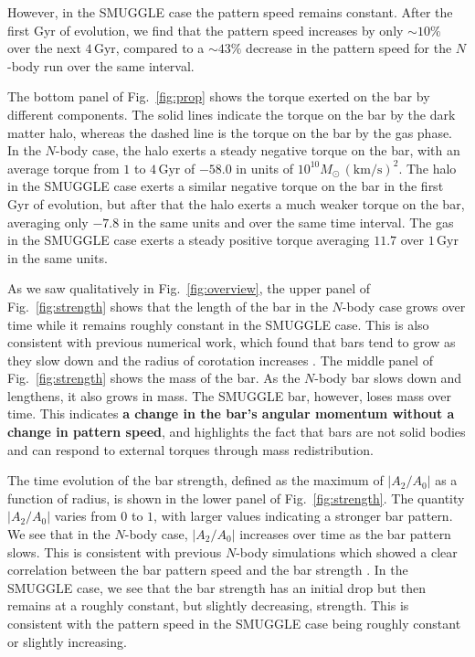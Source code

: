 \documentclass[twocolumn,linenumbers,trackchanges]{aastex631}
\newcommand{\Nbody}{$N$-body}
\newcommand{\SMUGGLE}{SMUGGLE}
\begin{document}
However, in the \SMUGGLE{} case the pattern speed remains constant. After the first
Gyr of evolution, we find that the pattern speed increases by only $\sim10\%$
over the next $4\,\textrm{Gyr}$, compared to a $\sim43\%$ decrease in the
pattern speed for the \Nbody{} run over the same interval.

The bottom panel of Fig.~\ref{fig:prop} shows the torque exerted on the bar by
different components. The solid lines indicate the torque on the bar by the dark
matter halo, whereas the dashed line is the torque on the bar by the gas phase.
In the \Nbody{} case, the halo exerts a steady negative torque on the bar, with
an average torque from $1$ to $4\,\textrm{Gyr}$ of $-58.0$ in units of
$10^{10}M_{\odot}\,(\textrm{km}/\textrm{s})^2$. The halo in the \SMUGGLE{} case
exerts a similar negative torque on the bar in the first Gyr of evolution, but
after that the halo exerts a much weaker torque on the bar, averaging only
$-7.8$ in the same units and over the same time interval. The gas in the \SMUGGLE{}
case exerts a steady positive torque averaging $11.7$ over $1\,\textrm{Gyr}$ in
the same units.

As we saw qualitatively in Fig.~\ref{fig:overview}, the upper panel of
Fig.~\ref{fig:strength} shows that the length of the bar in the \Nbody{} case
grows over time while it remains roughly constant in the \SMUGGLE{} case. This
is also consistent with previous numerical work, which found that bars tend to
grow as they slow down and the radius of corotation increases
\citep{2000ApJ...543..704D, 2003MNRAS.341.1179A}. The middle panel of
Fig.~\ref{fig:strength} shows the mass of the bar. As the \Nbody{} bar slows
down and lengthens, it also grows in mass. The \SMUGGLE{} bar, however, loses
mass over time. This indicates {\bf a change in the bar's angular momentum without 
a change in pattern speed}, and highlights the
fact that bars are not solid bodies and can respond to external torques through
mass redistribution.

The time evolution of the bar strength, defined as the maximum of
$\left|A_2/A_0\right|$ as a function of radius, is shown in the lower panel of
Fig.~\ref{fig:strength}. The quantity $\left|A_2/A_0\right|$ varies from $0$ to
$1$, with larger values indicating a stronger bar pattern. We see that in the
\Nbody{} case, $\left|A_2/A_0\right|$ increases over time as the bar pattern
slows. This is consistent with previous \Nbody{} simulations which showed a
clear correlation between the bar pattern speed and the bar strength
\citep[e.g.,][]{2003MNRAS.341.1179A}. In the \SMUGGLE{} case, we see that the
bar strength has an initial drop but then remains at a roughly constant, but
slightly decreasing, strength. This is consistent with the pattern speed in the
\SMUGGLE{} case being roughly constant or slightly increasing.
\end{document}
